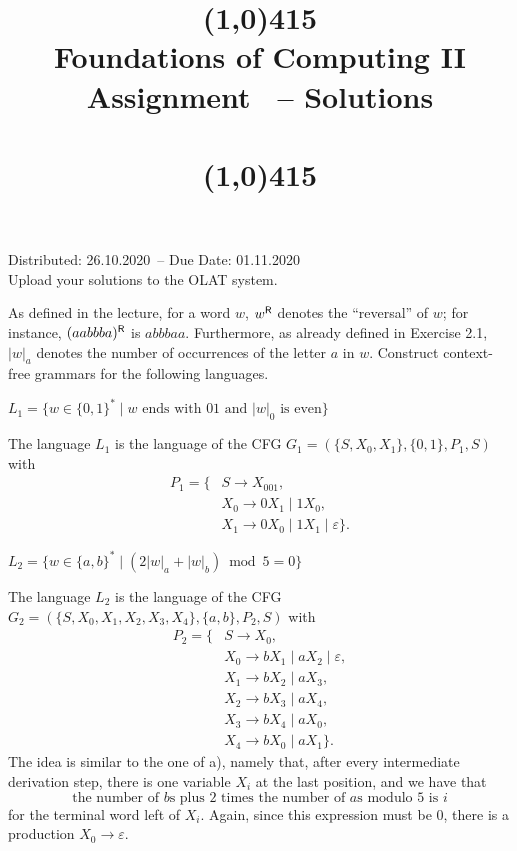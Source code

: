 \documentclass{exercise}
\title{\line(1,0){415}\\
  Foundations of Computing II\\
  \Large Assignment \theexercise\ -- Solutions\\[1em]
  \large{\topics}\\
  \line(1,0){415}}
\newcommand{\distdate}{26.10.2020}
\newcommand{\duedate}{01.11.2020}
\begin{document}
\maketitle

\begin{center}
  Distributed: \distdate\ -- Due Date: \duedate\\[1em]
  Upload your solutions to the OLAT system.\\[3em]
\end{center}



As defined in the lecture, for a word $w$, $w^{\textsf{R}}$ denotes the ``reversal''
of $w$; for instance, $(aabbba)^{\textsf{R}}$ is $abbbaa$.  Furthermore, as already defined
in Exercise 2.1, $|w|_a$ denotes the number of occurrences of the letter $a$ in
$w$.  Construct context-free grammars for the following languages.

\subtask $L_1 = \{w \in \{0,1\}^* \mid w\text{ ends with }01\text{ and }|w|_0\text{ is even}\}$

  \begin{solution}
    The language $L_1$ is the language of the CFG $G_1=(\{S,X_0,X_1\},\{0,1\},P_1,S)$ with
    \begin{align*}
      P_1 = \{ & S \to X_001,\\ 
      & X_0 \to 0X_1 \mid 1X_0,\\
      & X_1 \to 0X_0 \mid 1X_1 \mid \varepsilon\} .
    \end{align*}
  \end{solution}

\subtask $L_2 = \{w \in \{a,b\}^* \mid (2|w|_a+|w|_b) \bmod 5 = 0\}$

  \begin{solution}
    The language $L_2$ is the language of the CFG $G_2=(\{S,X_0,X_1,X_2,X_3,X_4\},\{a,b\},P_2,S)$ with
    \begin{align*}
      P_2 = \{ & S \to X_0,\\ 
               & X_0 \to bX_1 \mid aX_2 \mid \varepsilon,\\
               & X_1 \to bX_2 \mid aX_3, \\
               & X_2 \to bX_3 \mid aX_4, \\
               & X_3 \to bX_4 \mid aX_0, \\
               & X_4 \to bX_0 \mid aX_1 \} .
    \end{align*}
    The idea is similar to the one of a), namely that, after every intermediate derivation step,
    there is one variable $X_i$ at the last position, and we have that
    \[ \text{the number of }b\text{s plus 2 times the number of }a\text{s modulo 5 is } i \]
    for the terminal word left of $X_i$.  Again, since this expression must be $0$, there
    is a production $X_0\to \varepsilon$.
  \end{solution}
\end{document}
